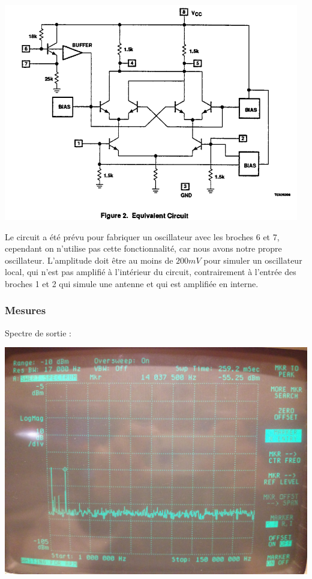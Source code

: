 \documentclass{article}
\begin{document}
\begin{center}
\includegraphics[width=0.85\linewidth]{shema_interne_ne602.png}
\end{center}


Le circuit a été prévu pour fabriquer un oscillateur avec les broches 6 et 7, cependant on n'utilise pas cette fonctionnalité, car nous avons notre propre oscillateur. L'amplitude doit être au moins de $200mV$ pour simuler un oscillateur local, qui n'est pas amplifié à l'intérieur du circuit, contrairement à l'entrée des broches 1 et 2 qui simule une antenne et qui est amplifiée en interne.

\subsubsection{Mesures}


Spectre de sortie :
\begin{center}
\includegraphics[width=0.7\linewidth]{8_3_1.jpg}
\end{center}
\end{document}
